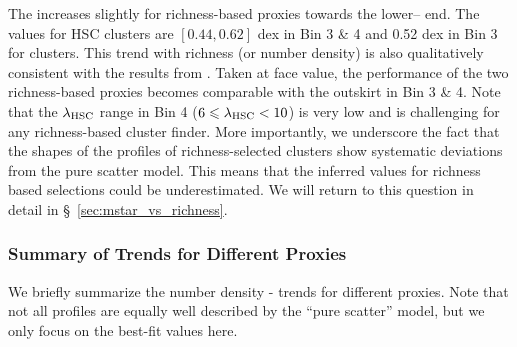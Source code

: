 \documentclass[fleqn,usenatbib,useAMS]{mnras}
\begin{document}
    The \sigmvir{} increases slightly for richness-based proxies towards the lower--\mvir{} end.
    The \sigmvir{} values for HSC \redm{} clusters are $[0.44, 0.62]$ dex in Bin 3 \& 4 and 0.52 dex
    in Bin 3 for \camira{} clusters.
    This trend with richness (or number density) is also qualitatively consistent with the results
    from \citet{Murata2018, Murata2019}.
    Taken at face value, the performance of the two richness-based proxies becomes comparable with
    the outskirt \mstar{} in Bin 3 \& 4.
    Note that the $\lambda_{\rm HSC}$ range in Bin 4 ($6 \leq \lambda_{\rm HSC} < 10$) is 
    very low and is challenging for any richness-based cluster finder.
    More importantly, we underscore the fact that the shapes of the \dsigma{} profiles of
    richness-selected clusters show systematic deviations from the pure scatter model. 
    This means that the inferred \sigmvir{} values for richness based selections could be
    underestimated. 
    We will return to this question in detail in \S\ \ref{sec:mstar_vs_richness}.

\subsubsection{Summary of \sigmvir{} Trends for Different \mvir{} Proxies}
    \label{sec:trend}

    We briefly summarize the number density - \sigmvir{} trends for different \mvir{} proxies.
    Note that not all \dsigma{} profiles are equally well described by the ``pure scatter'' model,
    but we only focus on the best-fit \sigmvir{} values here.
\end{document}
